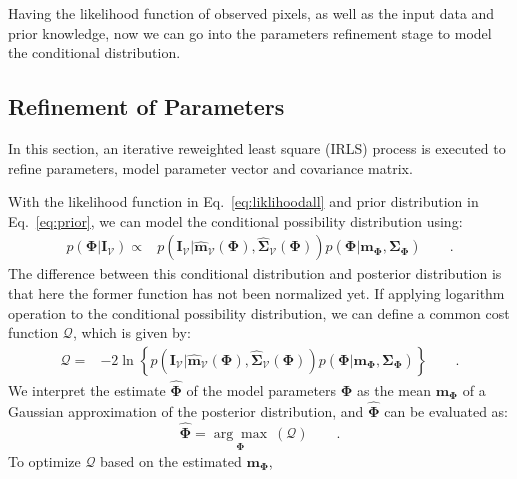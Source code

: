 \documentclass[conference]{IEEEtran}
\begin{document}
Having the likelihood function of observed pixels, as well as
the input data and prior knowledge, now we can go into the parameters
refinement stage to model the conditional distribution.

\subsection{Refinement of  Parameters}
\label{sec:ref}
In this section, an iterative reweighted least square (IRLS) process
is executed to refine parameters, model parameter vector and covariance matrix.

With the likelihood function in Eq.~\ref{eq:liklihoodall} and prior distribution in
Eq.~\ref{eq:prior}, we can model the conditional possibility distribution using:
\begin{align}
\label{eq:costf}
    p(\mathbf{\Phi}|\mathbf{\mathbf{I}}_{\mathcal{V}}) 
    \propto &
    p(\mathbf{\mathbf{I}_{\mathcal{V}}}
    |\hat{\mathbf{\mathbf{m}}}_{\mathcal{V}}(\mathbf{\Phi}),\hat{\mathbf{\mathbf{\Sigma}}}_{\mathcal{V}}(\mathbf{\Phi}))p(\mathbf{\Phi}
    | \mathbf{m}_{\mathbf{\Phi}},
    \mathbf{\mathbf{\Sigma}}_{\mathbf{\Phi}})\qquad.
\end{align}
The difference between this conditional distribution and posterior
distribution is that here the former function has not been normalized yet.
If applying logarithm operation to the conditional possibility
distribution, we can define a common cost function $\mathcal{Q}$,
which is given by:
\begin{align}
  \label{eq:costd}
  \mathcal{Q} = & -2 \ln \left\{  p(\mathbf{\mathbf{I}_{\mathcal{V}}}
    |\hat{\mathbf{\mathbf{m}}}_{\mathcal{V}}(\mathbf{\Phi}),\hat{\mathbf{\mathbf{\Sigma}}}_{\mathcal{V}}(\mathbf{\Phi}))p(\mathbf{\Phi}
    | \mathbf{m}_{\mathbf{\Phi}},
    \mathbf{\mathbf{\Sigma}}_{\mathbf{\Phi}})\right\}\qquad.
\end{align}
We interpret the estimate $\hat{\mathbf{\Phi}}$ of the model
parameters $\mathbf{\Phi}$ as  the mean $\mathbf{m}_{\mathbf{\Phi}}$ of a Gaussian
approximation of the posterior distribution, and
$\hat{\mathbf{\Phi}}$ can be evaluated as:
\begin{equation}
  \label{eq:maxcost}
  \hat{\mathbf{\Phi}} =
  \underset{\mathbf{\Phi}}{\arg\max} \
  (\mathcal{Q}) \qquad.
\end{equation}
To optimize $\mathcal{Q}$ based on the estimated $\mathbf{m}_{\mathbf{\Phi}}$,
\end{document}
